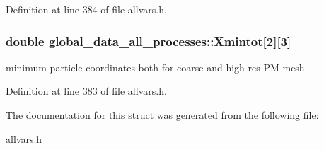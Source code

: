 Definition at line 384 of file allvars.h.

\hypertarget{structglobal__data__all__processes_a767b48fe7db038566f36edbb935d56f8}{
\subsubsection[{Xmintot}]{\setlength{\rightskip}{0pt plus 5cm}double {\bf global\_\-data\_\-all\_\-processes::Xmintot}\mbox{[}2\mbox{]}\mbox{[}3\mbox{]}}}
\label{structglobal__data__all__processes_a767b48fe7db038566f36edbb935d56f8}
minimum particle coordinates both for coarse and high-\/res PM-\/mesh 

Definition at line 383 of file allvars.h.



The documentation for this struct was generated from the following file:\begin{DoxyCompactItemize}
\item 
\hyperlink{allvars_8h}{allvars.h}\end{DoxyCompactItemize}
